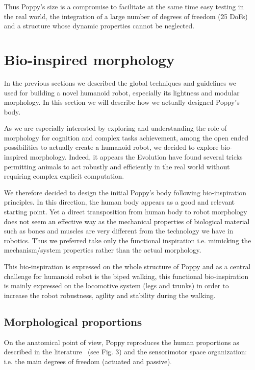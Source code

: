 Thus Poppy's size is a compromise to facilitate at the same time easy testing in the real world, the integration of a large number of degrees of freedom (25 DoFs) and a structure whose dynamic properties cannot be neglected.


\section{Bio-inspired morphology} %

In the previous sections we described the global techniques and guidelines we used for building a novel humanoid robot, especially its lightness and modular morphology. In this section we will describe how we actually designed Poppy's body.

As we are especially interested by exploring and understanding the role of morphology for cognition and complex tasks achievement, among the open ended possibilities to actually create a humanoid robot, we decided to explore bio-inspired morphology. Indeed, it appears the Evolution have found several tricks permitting animals to act robustly and efficiently in the real world without requiring complex explicit computation.

We therefore decided to design the initial Poppy's body following bio-inspiration principles. In this direction, the human body appears as a good and relevant starting point. Yet a direct transposition from human body to robot morphology does not seem an effective way as the mechanical properties of biological material such as bones and muscles are very different from the technology we have in robotics. Thus we preferred take only the functional inspiration i.e. mimicking the mechanism/system properties rather than the actual morphology.

This bio-inspiration is expressed on the whole structure of Poppy and as a central challenge for humanoid robot is the biped walking, this functional bio-inspiration is mainly expressed on the locomotive system (legs and trunks) in order to increase the robot robustness, agility and stability during the walking.


\subsection{Morphological proportions} %

On the anatomical point of view, Poppy reproduces the human proportions as described in the literature~\parencite{dufour2005biomecanique} (see Fig. 3) and the sensorimotor space organization: i.e. the main degrees of freedom (actuated and passive).

